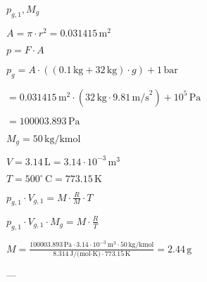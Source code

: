 \( p_{g,1}, M_g \)  

\( A = \pi \cdot r^2 = 0.031415 \, \text{m}^2 \)  

\( p = F \cdot A \)  

\( p_{g} = A \cdot \left( (0.1 \, \text{kg} + 32 \, \text{kg}) \cdot g \right) + 1 \, \text{bar} \)  

\( = 0.031415 \, \text{m}^2 \cdot \left( 32 \, \text{kg} \cdot 9.81 \, \text{m/s}^2 \right) + 10^5 \, \text{Pa} \)  

\( = 100003.893 \, \text{Pa} \)  

\( M_g = 50 \, \text{kg/kmol} \)  

\( V = 3.14 \, \text{L} = 3.14 \cdot 10^{-3} \, \text{m}^3 \)  

\( T = 500^\circ \, \text{C} = 773.15 \, \text{K} \)  

\( p_{g,1} \cdot V_{g,1} = M \cdot \frac{R}{M} \cdot T \)  

\( p_{g,1} \cdot V_{g,1} \cdot M_g = M \cdot \frac{R}{T} \)  

\( M = \frac{100003.893 \, \text{Pa} \cdot 3.14 \cdot 10^{-3} \, \text{m}^3 \cdot 50 \, \text{kg/kmol}}{8.314 \, \text{J/(mol·K)} \cdot 773.15 \, \text{K}} = 2.44 \, \text{g} \)  

---